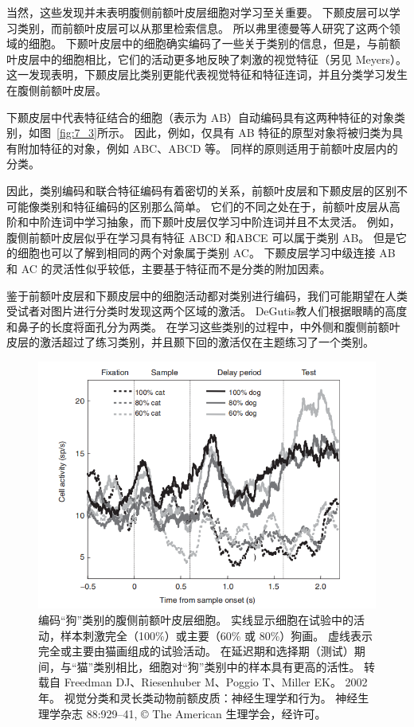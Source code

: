 当然，这些发现并未表明腹侧前额叶皮层细胞对学习至关重要。 
下颞皮层可以学习类别，而前额叶皮层可以从那里检索信息。 
所以弗里德曼等人\cite{freedman2003comparison}研究了这两个领域的细胞。 
下颞叶皮层中的细胞确实编码了一些关于类别的信息，但是，与前额叶皮层中的细胞相比，它们的活动更多地反映了刺激的视觉特征（另见 Meyers\cite{meyers2008dynamic}）。 
这一发现表明，下颞皮层比类别更能代表视觉特征和特征连词，并且分类学习发生在腹侧前额叶皮层。
\par

下颞皮层中代表特征结合的细胞（表示为 AB）自动编码具有这两种特征的对象类别，如图~\ref{fig:7_3}所示。
因此，例如，仅具有 AB 特征的原型对象将被归类为具有附加特征的对象，例如 ABC、ABCD 等。
同样的原则适用于前额叶皮层内的分类。
\par


因此，类别编码和联合特征编码有着密切的关系，前额叶皮层和下颞皮层的区别不可能像类别和特征编码的区别那么简单。 
它们的不同之处在于，前额叶皮层从高阶和中阶连词中学习抽象，而下颞叶皮层仅学习中阶连词并且不太灵活。
例如，腹侧前额叶皮层似乎在学习具有特征 ABCD 和ABCE 可以属于类别 AB。 
但是它的细胞也可以了解到相同的两个对象属于类别 AC。 
下颞皮层学习中级连接 AB 和 AC 的灵活性似乎较低，主要基于特征而不是分类的附加因素。
\par


鉴于前额叶皮层和下颞皮层中的细胞活动都对类别进行编码，我们可能期望在人类受试者对图片进行分类时发现这两个区域的激活。 
DeGutis\cite{degutis2009network}教人们根据眼睛的高度和鼻子的长度将面孔分为两类。 
在学习这些类别的过程中，中外侧和腹侧前额叶皮层的激活超过了练习类别，并且颞下回的激活仅在主题练习了一个类别。


\begin{figure}
	\centering
	\includegraphics[width=0.6\linewidth]{image_pfc/Fig_7_6}
	\caption{编码“狗”类别的腹侧前额叶皮层细胞。 实线显示细胞在试验中的活动，样本刺激完全（100\%）或主要（60\% 或 80\%）狗画。
		虚线表示完全或主要由猫画组成的试验活动。 
		在延迟期和选择期（测试）期间，与“猫”类别相比，细胞对“狗”类别中的样本具有更高的活性。 
		转载自 Freedman DJ、Riesenhuber M、Poggio T、Miller EK。 2002 年。
		视觉分类和灵长类动物前额皮质：神经生理学和行为。 
		神经生理学杂志 88:929–41, © The American 生理学会，经许可。\label{fig:7_6}}
\end{figure}
\par


